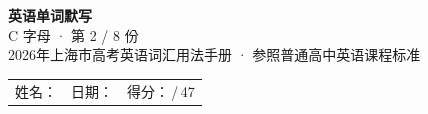 \documentclass[10pt,a4paper]{article}
\begin{document}
\pagestyle{plain}

\begin{center}
{\LARGE\bfseries 英语单词默写}\\[0.22em]
{\large C 字母 · 第 2 / 8 份}\\[0.18em]
{\small 2026年上海市高考英语词汇用法手册 · 参照普通高中英语课程标准}
\end{center}

\vspace{0.25em}
\noindent\begin{tabular}{@{}p{}@{}p{}@{}p{}@{}}
姓名：\underline{\hspace{2.0cm}} & 日期：\underline{\hspace{2.0cm}} & 得分：\underline{\hspace{1.3cm}}\,/\,47 \\
\end{tabular}

\vspace{0.3em}

\vspace{0.08em}
\end{document}

